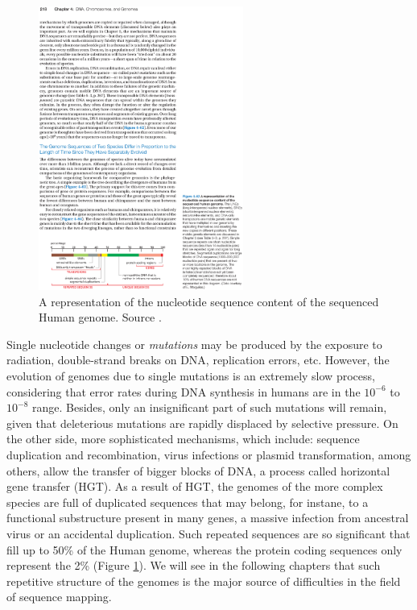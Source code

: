 \begin{figure}[h]
	\begin{minipage}[b]{\linewidth}
	  \centering
	  \includegraphics*[width=0.6\textwidth]{figures/chap1_genome_content}
	  \caption{A representation of the nucleotide sequence content of
       the sequenced Human genome. Source \cite{alberts}.}
	  \label{fig:chap1:genome-content}
   \end{minipage}
\end{figure}

Single nucleotide changes or {\em mutations} may be produced by the
exposure to radiation, double-strand breaks on DNA, replication
errors, etc. However, the evolution of genomes due to single
mutations is an extremely slow process, considering that error rates
during DNA synthesis in humans are in the $10^{-6}$ to $10^{-8}$
range. Besides, only an insignificant part of such mutations will
remain, given that deleterious mutations are rapidly displaced by
selective pressure. On the other side, more sophisticated mechanisms,
which include: sequence duplication and recombination, virus
infections or plasmid transformation, among others, allow the transfer
of bigger blocks of DNA, a process called horizontal gene
transfer (HGT). As a result of HGT, the genomes of the more complex
species are full of duplicated sequences that may belong, for instane,
to a functional substructure present in many genes, a massive
infection from ancestral virus or an accidental duplication. Such
repeated sequences are so significant that fill up to 50\% of the
Human genome, whereas the protein coding sequences only represent the
2\% (Figure \ref{fig:chap1:genome-content}). We will see in the
following chapters that such repetitive structure of the genomes
is the major source of difficulties in the field of sequence mapping.

